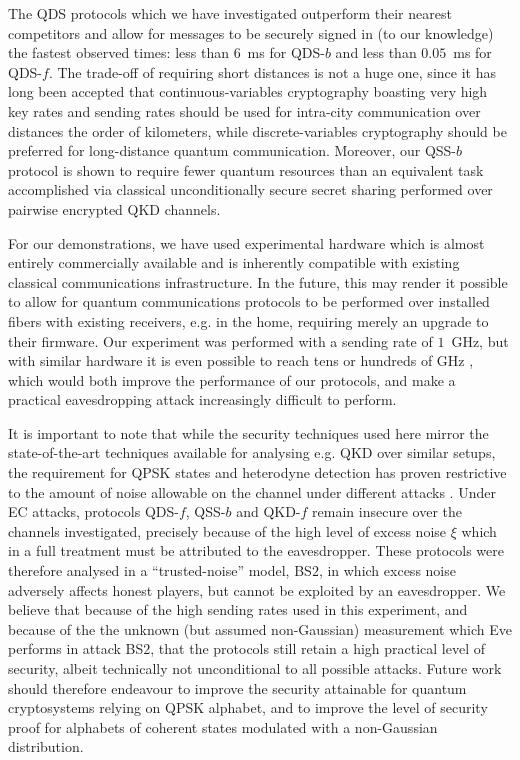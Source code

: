 The QDS protocols which we have investigated outperform their nearest competitors and allow for messages to be securely signed in (to our knowledge) the fastest observed times: less than $6$~ms for QDS-$b$ and less than $0.05$~ms for QDS-$f$. The trade-off of requiring short distances is not a huge one, since it has long been accepted \cite{Pirandola2015a} that continuous-variables cryptography boasting very high key rates and sending rates should be used for intra-city communication over distances the order of kilometers, while discrete-variables cryptography should be preferred for long-distance quantum communication. Moreover, our QSS-$b$ protocol is shown to require fewer quantum resources than an equivalent task accomplished via classical unconditionally secure secret sharing performed over pairwise encrypted QKD channels.

For our demonstrations, we have used experimental hardware which is almost entirely commercially available and is inherently compatible with existing classical communications infrastructure. In the future, this may render it possible to allow for quantum communications protocols to be performed over installed fibers with existing receivers, e.g. in the home, requiring merely an upgrade to their firmware. Our experiment was performed with a sending rate of $1$~GHz, but with similar hardware it is even possible to reach tens or hundreds of GHz \cite{Khan2015, Khan2016}, which would both improve the performance of our protocols, and make a practical eavesdropping attack increasingly difficult to perform. 

It is important to note that while the security techniques used here mirror the state-of-the-art techniques available for analysing e.g. QKD \cite{Papanastasiou2018} over similar setups, the requirement for QPSK states and heterodyne detection has proven restrictive to the amount of noise allowable on the channel under different attacks \cite{Zhao2009, Bradler2018}. Under EC attacks, protocols QDS-$f$, QSS-$b$ and QKD-$f$ remain insecure over the channels investigated, precisely because of the high level of excess noise $\xi$ which in a full treatment must be attributed to the eavesdropper. These protocols were therefore analysed in a ``trusted-noise'' model, BS$2$, in which excess noise adversely affects honest players, but cannot be exploited by an eavesdropper. We believe that because of the high sending rates used in this experiment, and because of the the unknown (but assumed non-Gaussian) measurement which Eve performs in attack BS$2$, that the protocols still retain a high practical level of security, albeit technically not unconditional to all possible attacks. Future work should therefore endeavour to improve the security attainable for quantum cryptosystems relying on QPSK alphabet, and to improve the level of security proof for alphabets of coherent states modulated with a non-Gaussian distribution.

